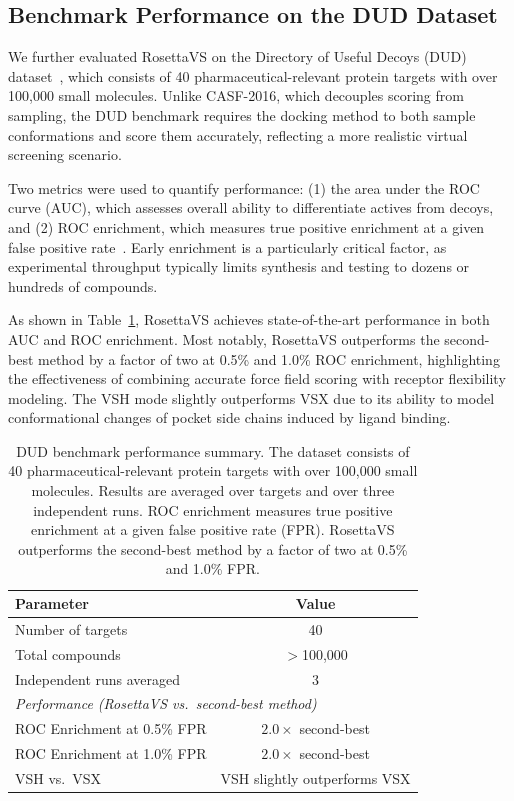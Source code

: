 \documentclass[11pt]{article}
\begin{document}
\subsection{Benchmark Performance on the DUD Dataset}

We further evaluated RosettaVS on the Directory of Useful Decoys (DUD) dataset~\citep{huang2006dud}, which consists of 40 pharmaceutical-relevant protein targets with over 100,000 small molecules. Unlike CASF-2016, which decouples scoring from sampling, the DUD benchmark requires the docking method to both sample conformations and score them accurately, reflecting a more realistic virtual screening scenario.

Two metrics were used to quantify performance: (1) the area under the ROC curve (AUC), which assesses overall ability to differentiate actives from decoys, and (2) ROC enrichment, which measures true positive enrichment at a given false positive rate~\citep{truchon2007roc}. Early enrichment is a particularly critical factor, as experimental throughput typically limits synthesis and testing to dozens or hundreds of compounds.

As shown in Table~\ref{tab:dud}, RosettaVS achieves state-of-the-art performance in both AUC and ROC enrichment. Most notably, RosettaVS outperforms the second-best method by a factor of two at 0.5\% and 1.0\% ROC enrichment, highlighting the effectiveness of combining accurate force field scoring with receptor flexibility modeling. The VSH mode slightly outperforms VSX due to its ability to model conformational changes of pocket side chains induced by ligand binding.

\begin{table}[!ht]
\centering
\caption{DUD benchmark performance summary. The dataset consists of 40 pharmaceutical-relevant protein targets with over 100,000 small molecules. Results are averaged over targets and over three independent runs. ROC enrichment measures true positive enrichment at a given false positive rate (FPR). RosettaVS outperforms the second-best method by a factor of two at 0.5\% and 1.0\% FPR.}
\label{tab:dud}
\begin{tabular}{lc}
\toprule
\textbf{Parameter} & \textbf{Value} \\
\midrule
Number of targets & 40 \\
Total compounds & $>$100,000 \\
Independent runs averaged & 3 \\
\midrule
\multicolumn{2}{l}{\textit{Performance (RosettaVS vs.\ second-best method)}} \\
\midrule
ROC Enrichment at 0.5\% FPR & $2.0\times$ second-best \\
ROC Enrichment at 1.0\% FPR & $2.0\times$ second-best \\
VSH vs.\ VSX & VSH slightly outperforms VSX \\
\bottomrule
\end{tabular}
\end{table}
\end{document}
